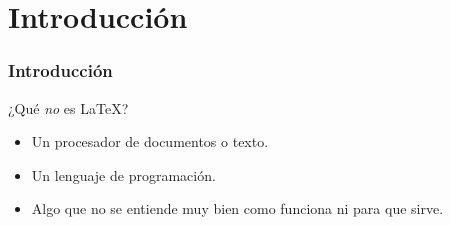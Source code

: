 \section{Introducción}\label{sec:Introducción}

\begin{frame}
    \frametitle{Introducción}
        \begin{tcolorbox}[colframe=color1]
            \begin{center}
                ¿Qué \textit{no} es \LaTeX ?
            \end{center}
        \end{tcolorbox}
        
        \pause
        \begin{itemize}
            \item Un procesador de documentos o texto.
            \item Un lenguaje de programación.
            \item Algo que no se entiende muy bien como funciona ni para que sirve. 
        \end{itemize}
        
    \end{frame}

